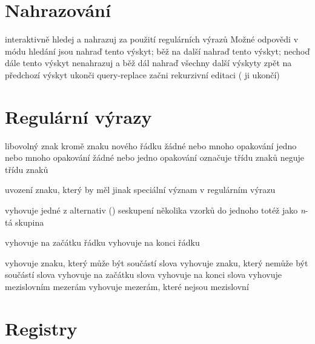 \section{Nahrazování}

 interaktivně hledej a nahrazuj
 za použití regulárních výrazů
\askip
Možné odpovědi v módu hledání jsou
\askip
{} nahraď tento výskyt; běž na další
\key{,} nahraď tento výskyt; nechoď dále
 tento výskyt nenahrazuj a běž dál
\key{!} nahraď všechny další výskyty
\key{\^{}} zpět na předchozí výskyt
 ukonči query-replace
 začni rekurzivní editaci ( ji ukončí)

\section{Regulární výrazy}

 libovolný znak kromě znaku nového řádku
\key{*} žádné nebo mnoho opakování
\key{+} jedno nebo mnoho opakování
 žádné nebo jedno opakování
\key{[$\ldots$]} označuje třídu znaků
\key{[\^{}$\ldots$]} neguje třídu znaků

 uvození znaku, který by měl jinak speciální význam v
regulárním výrazu

\key{$\ldots$\\|$\ldots$\\|$\ldots$} vyhovuje jedné z alternativ ()
\key{\\( $\ldots$ \\)} seskupení několika vzorků do jednoho
 totéž jako {\it n\/}-tá skupina

\key{\^{}} vyhovuje na začátku řádku
\key{\$} vyhovuje na konci řádku

\key{\\w} vyhovuje znaku, který může být součástí slova
\key{\\W} vyhovuje znaku, který nemůže být součástí slova
\key{\\<} vyhovuje na začátku slova
\key{\\>} vyhovuje na konci slova
\key{\\b} vyhovuje mezislovním mezerám
\key{\\B} vyhovuje mezerám, které nejsou mezislovní

\section{Registry}

